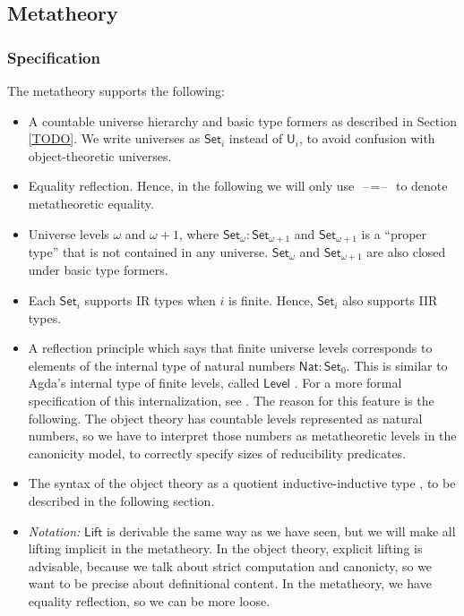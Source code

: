 \documentclass[acmsmall,screen,review,anonymous]{acmart}
\newcommand{\msf}[1]{{\mathsf{#1}}}
\newcommand{\U}{\msf{U}}
\newcommand{\Set}{\msf{Set}}
\newcommand{\Nat}{\msf{Nat}}
\newcommand{\Lift}{\msf{Lift}}
\newcommand{\blank}{{\mathord{\hspace{1pt}\text{--}\hspace{1pt}}}}
\newcommand{\Level}{\msf{Level}}
\begin{document}
\subsection{Metatheory}\label{sec:metatheory}

\subsubsection{Specification} The metatheory supports the following:
\begin{itemize}
  \item A countable universe hierarchy and basic type formers as described in Section \ref{TODO}.
    We write universes as $\Set_i$ instead of $\U_i$, to avoid confusion with object-theoretic
    universes.
  \item Equality reflection. Hence, in the following we will only use $\blank\!=\!\blank$ to denote
    metatheoretic equality.
  \item Universe levels $\omega$ and $\omega+1$, where $\Set_\omega : \Set_{\omega + 1}$ and $\Set_{\omega + 1}$
        is a ``proper type'' that is not contained in any universe. $\Set_\omega$ and $\Set_{\omega + 1}$ are
        also closed under basic type formers.
  \item Each $\Set_i$ supports IR types when $i$ is finite. Hence, $\Set_i$ also supports IIR types.
  \item A reflection principle which says that finite universe levels corresponds to elements of the
    internal type of natural numbers $\Nat : \Set_0$. This is similar to Agda's internal type of
    finite levels, called $\Level$ \cite{TODO}.  For a more formal specification of this
    internalization, see \cite{TODO}. The reason for this feature is the following. The object
    theory has countable levels represented as natural numbers, so we have to interpret those
    numbers as metatheoretic levels in the canonicity model, to correctly specify sizes of
    reducibility predicates.
  \item The syntax of the object theory as a quotient inductive-inductive type \cite{TODO}, to be
    described in the following section.
  \item \emph{Notation:} $\Lift$ is derivable the same way as we have seen, but we will make all
    lifting implicit in the metatheory. In the object theory, explicit lifting is advisable, because
    we talk about strict computation and canonicty, so we want to be precise about definitional
    content. In the metatheory, we have equality reflection, so we can be more loose.

\end{itemize}
\end{document}
